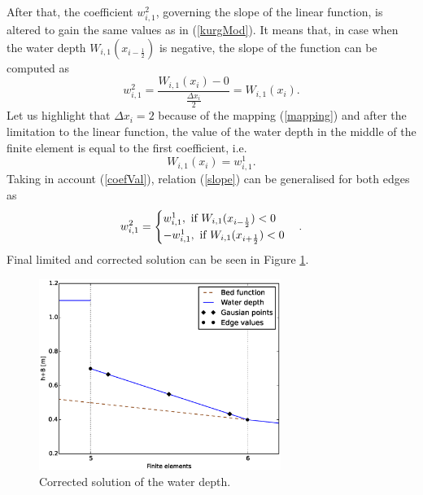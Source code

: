 After that, the coefficient $w_{i,1}^2$, governing the slope of the linear function, is altered to gain the same values as in (\ref{kurgMod}). It means that, in case when the water depth $W_{i,1}(x_{i-\frac12})$ is negative, the slope of the function can be computed as
\begin{equation}\label{slope}
w_{i,1}^2=\frac{W_{i,1}(x_{i})-0}{ \frac{\Delta x_i}2}=W_{i,1}(x_{i}).
\end{equation}
Let us highlight that $\Delta x_i=2$ because of the mapping (\ref{mapping}) and after the limitation to the linear function, the value of the water depth in the middle of the finite element is equal to the first coefficient, i.e.
\begin{equation}\label{coefVal}
W_{i,1}(x_{i})=w_{i,1}^1.
\end{equation}
 Taking in account (\ref{coefVal}), relation (\ref{slope}) can be generalised for both edges as
\begin{equation}
w_{i,1}^2=\begin{cases}
w_{i,1}^1, \text{  if  } W_{i,1}(x_{i-\frac12})<0 \\
-w_{i,1}^1, \text{  if  } W_{i,1}(x_{i+\frac12})<0
\end{cases}.\\
\end{equation}
Final limited and corrected solution can be seen in Figure \ref{linCor}.
\begin{figure}
\centering
\includegraphics[width=0.7\textwidth]{OBR/linCor.eps}
\caption{Corrected solution of the water depth.}\label{linCor}
\end{figure}




